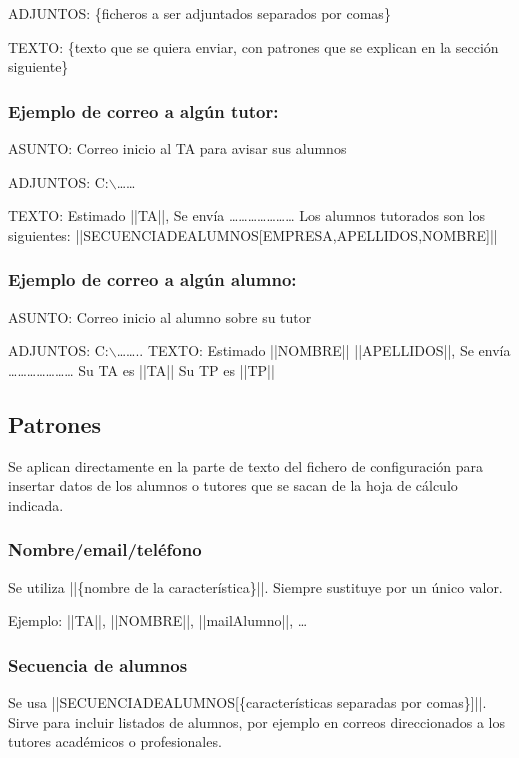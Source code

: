 \documentclass[11pt]{article}
\begin{document}
ADJUNTOS: \{ficheros a ser adjuntados separados por comas\}

TEXTO: \{texto que se quiera enviar, con patrones que se explican en la sección siguiente\}

\subsubsection{Ejemplo de correo a algún tutor:}
\label{sec-4-1-1}

ASUNTO: Correo inicio al TA para avisar sus alumnos

ADJUNTOS: C:$\backslash$\ldots{}\ldots{}

TEXTO: Estimado ||TA||,
Se envía \ldots{}\ldots{}\ldots{}\ldots{}\ldots{}\ldots{}\ldots{}
Los alumnos tutorados son los siguientes: ||SECUENCIADEALUMNOS[EMPRESA,APELLIDOS,NOMBRE]||

\subsubsection{Ejemplo de correo a algún alumno:}
\label{sec-4-1-2}

ASUNTO: Correo inicio al alumno sobre su tutor

ADJUNTOS: C:$\backslash$\ldots{}\ldots{}..
TEXTO: Estimado ||NOMBRE|| ||APELLIDOS||,
Se envía \ldots{}\ldots{}\ldots{}\ldots{}\ldots{}\ldots{}\ldots{}
Su TA es ||TA||
Su TP es ||TP||


\subsection{Patrones}
\label{sec-4-2}
Se aplican directamente en la parte de texto del fichero de configuración para insertar datos de los alumnos o tutores que se sacan de la hoja de cálculo indicada.
\subsubsection{Nombre/email/teléfono}
\label{sec-4-2-1}
Se utiliza ||\{nombre de la característica\}||. Siempre sustituye por un único valor.

Ejemplo: ||TA||, ||NOMBRE||, ||mailAlumno||, \ldots{}
\subsubsection{Secuencia de alumnos}
\label{sec-4-2-2}
Se usa ||SECUENCIADEALUMNOS[\{características separadas por comas\}]||. Sirve para incluir listados de alumnos, por ejemplo en correos direccionados a los tutores académicos o profesionales.
\end{document}
